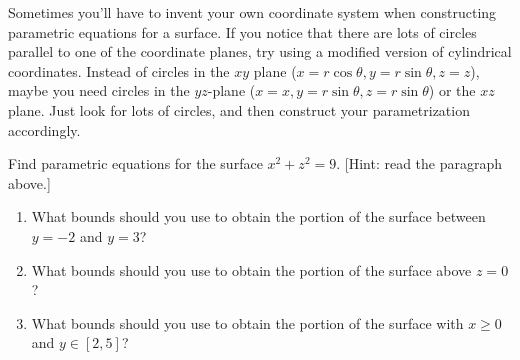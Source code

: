 Sometimes you'll have to invent your own coordinate system when constructing parametric equations for a surface.  If you notice that there are lots of circles parallel to one of the coordinate planes, try using a modified version of cylindrical coordinates. Instead of circles in the $xy$ plane ($x=r\cos\theta,y=r\sin\theta,z=z$), maybe you need circles in the $yz$-plane ($x=x,y=r\sin\theta,z=r\sin\theta$) or the $xz$ plane.  Just look for lots of circles, and then construct your parametrization accordingly.
\begin{problem}
%
Find parametric equations for the surface $x^2+z^2=9$. [Hint: read the paragraph above.]  
\begin{enumerate}
 \item{}%
 What bounds should you use to obtain the portion of the surface between $y=-2$ and $y=3$?
 \item What bounds should you use to obtain the portion of the surface above $z=0$?
 \item What bounds should you use to obtain the portion of the surface with $x\geq 0$ and $y\in[2,5]$?
\end{enumerate}
\end{problem}

